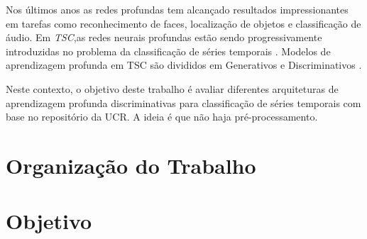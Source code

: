 Nos últimos anos as redes profundas tem alcançado resultados impressionantes em tarefas como reconhecimento de faces, localização de objetos e classificação de áudio. Em \textit{TSC},as redes neurais profundas estão sendo progressivamente introduzidas no problema da classificação de séries temporais \cite{Zheng2014} \cite{Wang01}  \cite{tscFromScratch}. Modelos de aprendizagem profunda em TSC são divididos em Generativos e Discriminativos \cite{ismail2018}.

Neste contexto, o objetivo deste trabalho é avaliar diferentes arquiteturas de aprendizagem profunda discriminativas para classificação de séries temporais com base no repositório da UCR. A ideia é que não haja pré-processamento.


\section{Organização do Trabalho}




\section{Objetivo}

